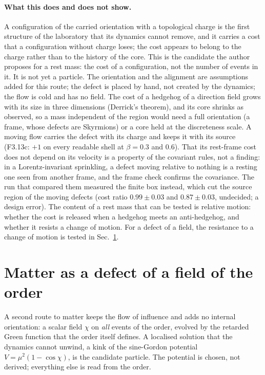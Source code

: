\paragraph{What this does and does not show.} A configuration of the carried orientation with a topological
charge is the first structure of the laboratory that its dynamics cannot remove, and it carries a cost that a
configuration without charge loses; the cost appears to belong to the charge rather than to the history of the
core. This is the candidate the author proposes for a rest mass: the cost of a configuration, not the number of
events in it. It is not yet a particle. The orientation and the alignment are assumptions added for this
route; the defect is placed by hand, not created by the dynamics; the flow is cold and has no field. The cost
of a hedgehog of a direction field grows with its size in three dimensions (Derrick's theorem), and its core
shrinks as observed, so a mass independent of the region would need a full orientation (a frame, whose
defects are Skyrmions) or a core held at the discreteness scale. A moving flow carries the defect with its charge and
keeps it with its source (F3.13c: $+1$ on every readable shell at $\beta=0.3$ and $0.6$). That its rest-frame
cost does not depend on its velocity is a property of the covariant rules, not a finding: in a Lorentz-invariant
sprinkling, a defect moving relative to nothing is a resting one seen from another frame, and the frame check
confirms the covariance. The run that compared them measured the finite box instead, which cut the source region
of the moving defects (cost ratio $0.99\pm0.03$ and $0.87\pm0.03$, undecided; a design error). The content of a rest
mass that can be tested is relative motion: whether the cost is released when a hedgehog meets an anti-hedgehog,
and whether it resists a change of motion. For a defect of a field, the resistance to a change of motion is
tested in Sec.~\ref{sec:fielddefect}.

\section{Matter as a defect of a field of the order}\label{sec:fielddefect}

A second route to matter keeps the flow of influence and adds no internal orientation: a scalar field $\chi$ on
\emph{all} events of the order, evolved by the retarded Green function that the order itself defines. A localised
solution that the dynamics cannot unwind, a kink of the sine-Gordon potential $V=\mu^2(1-\cos\chi)$, is the
candidate particle. The potential is chosen, not derived; everything else is read from the order.

